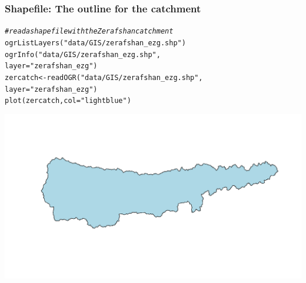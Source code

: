\documentclass[xcolor=table, xcolor=dvipsnames]{beamer}\usepackage[]{graphicx}\usepackage[]{color}
\makeatletter
\newcommand{\hlstr}[1]{\textcolor[rgb]{0.545,0.137,0.137}{#1}}
\newcommand{\hlcom}[1]{\textcolor[rgb]{0,0.392,0}{\textit{#1}}}
\newcommand{\hlstd}[1]{\textcolor[rgb]{0,0,0}{#1}}
\newcommand{\hlkwb}[1]{\textcolor[rgb]{0,0,0}{#1}}
\newcommand{\hlkwc}[1]{\textcolor[rgb]{1,0,1}{#1}}
\newcommand{\hlkwd}[1]{\textcolor[rgb]{0,0,1}{#1}}
\newenvironment{kframe}{%
 \def\at@end@of@kframe{}%
 \ifinner\ifhmode%
  \def\at@end@of@kframe{\end{minipage}}%
  \begin{minipage}{\columnwidth}%
 \fi\fi%
 \def\FrameCommand##1{\hskip\@totalleftmargin \hskip-\fboxsep
 \colorbox{shadecolor}{##1}\hskip-\fboxsep
     \hskip-\linewidth \hskip-\@totalleftmargin \hskip\columnwidth}%
 \MakeFramed {\advance\hsize-\width
   \@totalleftmargin\z@ \linewidth\hsize
   \@setminipage}}%
 {\par\unskip\endMakeFramed%
 \at@end@of@kframe}
\newenvironment{knitrout}{}{} %
\makeatother
\begin{document}

\begin{frame}[fragile]\frametitle{Shapefile: The outline for the catchment}
\begin{knitrout}
\color{fgcolor}\begin{kframe}
\begin{alltt}
\hlcom{# read a shapefile with the Zerafshan catchment}
\hlkwd{ogrListLayers}\hlstd{(}\hlstr{"data/GIS/zerafshan_ezg.shp"}\hlstd{)}
\hlkwd{ogrInfo}\hlstd{(}\hlstr{"data/GIS/zerafshan_ezg.shp"}\hlstd{,}
        \hlkwc{layer}\hlstd{=}\hlstr{"zerafshan_ezg"}\hlstd{)}
\hlstd{zercatch} \hlkwb{<-} \hlkwd{readOGR}\hlstd{(}\hlstr{"data/GIS/zerafshan_ezg.shp"}\hlstd{,}
                    \hlkwc{layer}\hlstd{=}\hlstr{"zerafshan_ezg"}\hlstd{)}
\hlkwd{plot}\hlstd{(zercatch,} \hlkwc{col}\hlstd{=}\hlstr{"lightblue"}\hlstd{)}
\end{alltt}
\end{kframe}
\end{knitrout}
\begin{center}
\includegraphics[width=.55\textwidth]{./externalfig/Zerafshan_shapefile_import.pdf}
\end{center}
\end{frame}

\end{document}
